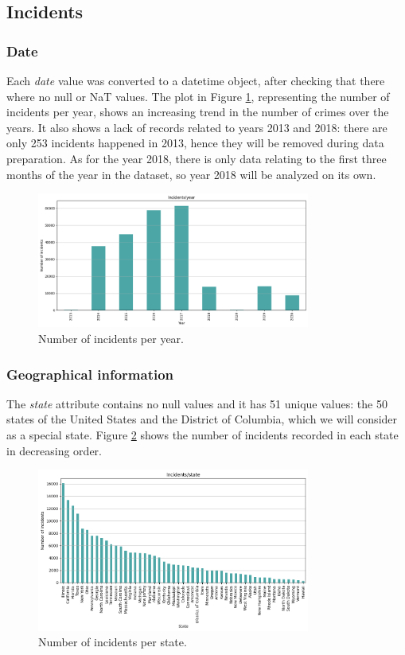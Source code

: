 \documentclass[10pt,a4paper]{report}
\begin{document}
\subsection{Incidents}

\subsubsection{Date}

Each \textit{date} value was converted to a datetime object, after checking that there where no null or NaT values.
The plot in Figure \ref{incidents_per_year}, representing the number of incidents per year, shows an increasing trend in the number of crimes over the years.
It also shows a lack of records related to years 2013 and 2018: there are only 253 incidents happened in 2013, hence they will be removed during data preparation.
As for the year 2018, there is only data relating to the first three months of the year in the dataset, so year 2018 will be analyzed on its own.

\begin{figure}[h]
	\includegraphics[width=0.8\textwidth]{incidents_per_year}
	\centering
	\caption{Number of incidents per year.}
	\label{incidents_per_year}
\end{figure}

\subsubsection{Geographical information}

The \textit{state} attribute contains no null values and it has 51 unique values: the 50 states of the United States and the District of Columbia, which we will consider as a special state.
Figure \ref{incidents_per_state} shows the number of incidents recorded in each state in decreasing order.

\begin{figure}[h]
	\includegraphics[width=0.8\textwidth]{incidents_per_state}
	\centering
	\caption{Number of incidents per state.}
	\label{incidents_per_state}
\end{figure}
\end{document}
